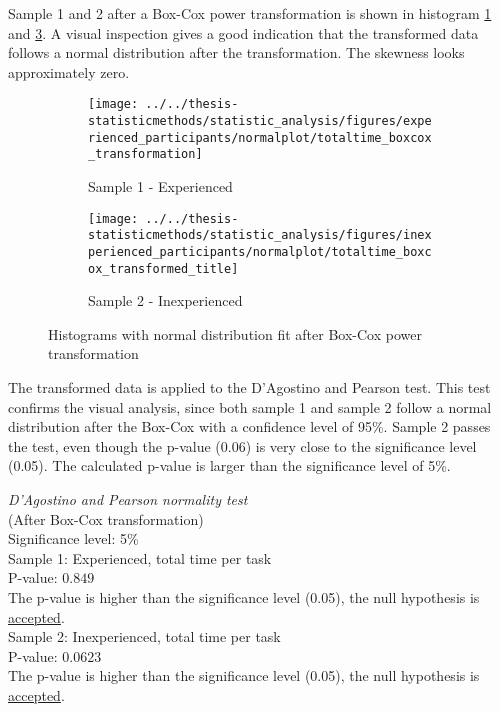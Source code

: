 Sample 1 and 2 after a Box-Cox power transformation is shown in histogram \ref{fig:totaltimeboxcoxtransformation_experienced} and \ref{fig:totaltimeboxcoxtransformedtitle_inexperienced}. A visual inspection gives a good indication that the transformed data follows a normal distribution after the transformation. The skewness looks approximately zero.

\begin{figure}[H]
	\centering
	\begin{subfigure}[b]{0.48\textwidth}
		\centering
		\texttt{[image: ../../thesis-statisticmethods/statistic\_analysis/figures/experienced\_participants/normalplot/totaltime\_boxcox\_transformation]}
		\caption[Experienced, Box-Cox]{Sample 1 - Experienced}
		\label{fig:totaltimeboxcoxtransformation_experienced}
	\end{subfigure}
	\begin{subfigure}[b]{0.48\textwidth}
		\centering
		\texttt{[image: ../../thesis-statisticmethods/statistic\_analysis/figures/inexperienced\_participants/normalplot/totaltime\_boxcox\_transformed\_title]}
		\caption[Inexperienced, Box-Cox]{Sample 2 - Inexperienced}
		\label{fig:totaltimeboxcoxtransformedtitle_inexperienced}
	\end{subfigure}
\caption{Histograms with normal distribution fit after Box-Cox power transformation}
\end{figure}

The transformed data is applied to the D'Agostino and Pearson test. This test confirms the visual analysis, since both sample 1 and sample 2 follow a normal distribution after the Box-Cox with a confidence level of 95\%. Sample 2 passes the test, even though the p-value (0.06) is very close to the significance level (0.05). The calculated p-value is larger than the significance level of 5\%. \\[0.3cm] 

\begin{center}
	\begin{tcolorbox}[width=0.8\textwidth]
		\centering
		\textit{D'Agostino and Pearson normality test}\\
		(After Box-Cox transformation) \\
		Significance level: 5\%  \\[0.5cm]
		
		Sample 1: Experienced, total time per task\\
		P-value: $0.849$\\
		The p-value is higher than the significance level (0.05), the null hypothesis is \underline{accepted}. \\[0.5cm]
		
		Sample 2: Inexperienced, total time per task \\ %
		P-value: $0.0623$ \\
		The p-value is higher than the significance level (0.05), the null hypothesis is \underline{accepted}. \\[0.5cm]
	\end{tcolorbox}
\end{center}


